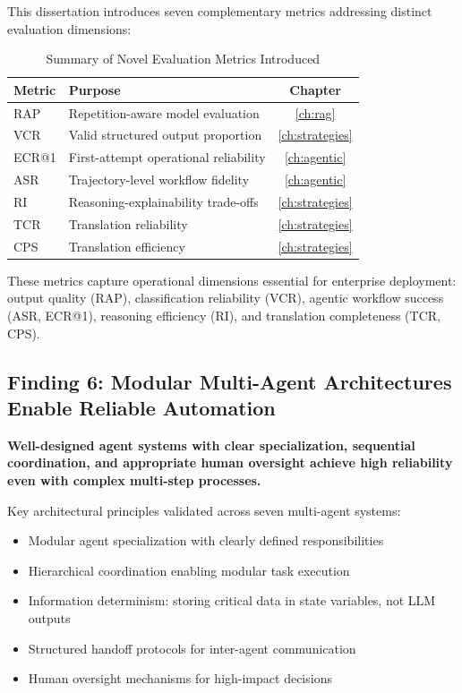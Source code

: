 This dissertation introduces seven complementary metrics addressing distinct evaluation dimensions:

\begin{table}[htbp]
\centering
\caption{Summary of Novel Evaluation Metrics Introduced}
\label{tab:metrics_summary}
\begin{tabular}{@{}llc@{}}
\toprule
\textbf{Metric} & \textbf{Purpose} & \textbf{Chapter} \\
\midrule
RAP & Repetition-aware model evaluation & \ref{ch:rag} \\
VCR & Valid structured output proportion & \ref{ch:strategies} \\
ECR@1 & First-attempt operational reliability & \ref{ch:agentic} \\
ASR & Trajectory-level workflow fidelity & \ref{ch:agentic} \\
RI & Reasoning-explainability trade-offs & \ref{ch:strategies} \\
TCR & Translation reliability & \ref{ch:strategies} \\
CPS & Translation efficiency & \ref{ch:strategies} \\
\bottomrule
\end{tabular}
\end{table}

These metrics capture operational dimensions essential for enterprise deployment: output quality (RAP), classification reliability (VCR), agentic workflow success (ASR, ECR@1), reasoning efficiency (RI), and translation completeness (TCR, CPS).

\subsection{Finding 6: Modular Multi-Agent Architectures Enable Reliable Automation}

\textbf{Well-designed agent systems with clear specialization, sequential coordination, and appropriate human oversight achieve high reliability even with complex multi-step processes.}

Key architectural principles validated across seven multi-agent systems:
\begin{itemize}[leftmargin=*]
    \item Modular agent specialization with clearly defined responsibilities
    \item Hierarchical coordination enabling modular task execution
    \item Information determinism: storing critical data in state variables, not LLM outputs
    \item Structured handoff protocols for inter-agent communication
    \item Human oversight mechanisms for high-impact decisions
\end{itemize}

